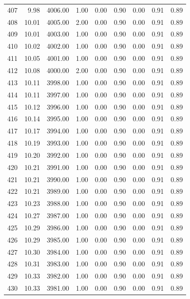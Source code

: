 \documentclass{article}\usepackage[]{graphicx}\usepackage[]{color}
\begin{document}
\begin{longtable}{rrrrrrrrr}
  407 & 9.98 & 4006.00 & 1.00 & 0.00 & 0.90 & 0.00 & 0.91 & 0.89 \\ 
  408 & 10.01 & 4005.00 & 2.00 & 0.00 & 0.90 & 0.00 & 0.91 & 0.89 \\ 
  409 & 10.01 & 4003.00 & 1.00 & 0.00 & 0.90 & 0.00 & 0.91 & 0.89 \\ 
  410 & 10.02 & 4002.00 & 1.00 & 0.00 & 0.90 & 0.00 & 0.91 & 0.89 \\ 
  411 & 10.05 & 4001.00 & 1.00 & 0.00 & 0.90 & 0.00 & 0.91 & 0.89 \\ 
  412 & 10.08 & 4000.00 & 2.00 & 0.00 & 0.90 & 0.00 & 0.91 & 0.89 \\ 
  413 & 10.11 & 3998.00 & 1.00 & 0.00 & 0.90 & 0.00 & 0.91 & 0.89 \\ 
  414 & 10.11 & 3997.00 & 1.00 & 0.00 & 0.90 & 0.00 & 0.91 & 0.89 \\ 
  415 & 10.12 & 3996.00 & 1.00 & 0.00 & 0.90 & 0.00 & 0.91 & 0.89 \\ 
  416 & 10.14 & 3995.00 & 1.00 & 0.00 & 0.90 & 0.00 & 0.91 & 0.89 \\ 
  417 & 10.17 & 3994.00 & 1.00 & 0.00 & 0.90 & 0.00 & 0.91 & 0.89 \\ 
  418 & 10.19 & 3993.00 & 1.00 & 0.00 & 0.90 & 0.00 & 0.91 & 0.89 \\ 
  419 & 10.20 & 3992.00 & 1.00 & 0.00 & 0.90 & 0.00 & 0.91 & 0.89 \\ 
  420 & 10.21 & 3991.00 & 1.00 & 0.00 & 0.90 & 0.00 & 0.91 & 0.89 \\ 
  421 & 10.21 & 3990.00 & 1.00 & 0.00 & 0.90 & 0.00 & 0.91 & 0.89 \\ 
  422 & 10.21 & 3989.00 & 1.00 & 0.00 & 0.90 & 0.00 & 0.91 & 0.89 \\ 
  423 & 10.23 & 3988.00 & 1.00 & 0.00 & 0.90 & 0.00 & 0.91 & 0.89 \\ 
  424 & 10.27 & 3987.00 & 1.00 & 0.00 & 0.90 & 0.00 & 0.91 & 0.89 \\ 
  425 & 10.29 & 3986.00 & 1.00 & 0.00 & 0.90 & 0.00 & 0.91 & 0.89 \\ 
  426 & 10.29 & 3985.00 & 1.00 & 0.00 & 0.90 & 0.00 & 0.91 & 0.89 \\ 
  427 & 10.30 & 3984.00 & 1.00 & 0.00 & 0.90 & 0.00 & 0.91 & 0.89 \\ 
  428 & 10.31 & 3983.00 & 1.00 & 0.00 & 0.90 & 0.00 & 0.91 & 0.89 \\ 
  429 & 10.33 & 3982.00 & 1.00 & 0.00 & 0.90 & 0.00 & 0.91 & 0.89 \\ 
  430 & 10.33 & 3981.00 & 1.00 & 0.00 & 0.90 & 0.00 & 0.91 & 0.89 \\ 

\end{longtable}
\end{document}
